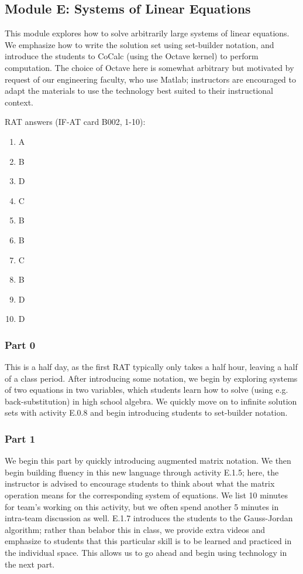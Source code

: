 \documentclass{article}
\begin{document}
\subsection*{Module E: Systems of Linear Equations}
This module explores how to solve arbitrarily large systems of linear equations.  We emphasize how to write the solution set using set-builder notation, and introduce the students to CoCalc (using the Octave kernel) to perform computation.  The choice of Octave here is somewhat arbitrary but motivated by request of our engineering faculty, who use Matlab; instructors are encouraged to adapt the materials to use the technology best suited to their instructional context.  

RAT answers (IF-AT card B002, 1-10):
\begin{multicols}{10}
\begin{enumerate}[1)]
\item A
\item B
\item D
\item C
\item B
\item B
\item C
\item B
\item D
\item D
\end{enumerate}
\end{multicols}

\subsubsection*{Part 0}
This is a half day, as the first RAT typically only takes a half hour, leaving a half of a class period.  After introducing some notation, we begin by exploring systems of two equations in two variables, which students learn how to solve (using e.g. back-substitution) in high school algebra.  We quickly move on to infinite solution sets with activity E.0.8 and begin introducing students to set-builder notation.


\subsubsection*{Part 1}
We begin this part by quickly introducing augmented matrix notation.  We then begin building fluency in this new language through activity E.1.5; here, the instructor is advised to encourage students to think about what the matrix operation means for the corresponding system of equations.  We list 10 minutes for team's working on this activity, but we often spend another 5 minutes in intra-team discussion as well.  E.1.7 introduces the students to the Gauss-Jordan algorithm; rather than belabor this in class, we provide extra videos and emphasize to students that this particular skill is to be learned and practiced in the individual space.  This allows us to go ahead and begin using technology in the next part.
\end{document}
